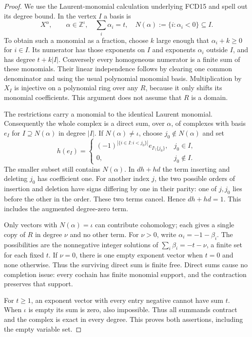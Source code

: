\documentclass[11pt,a4paper]{article}
\numberwithin{equation}{section}
\theoremstyle{remark}\newtheorem{remark}[theorem]{Remark}
\begin{document}
\begin{proof}
We use the Laurent-monomial calculation underlying FCD15 and spell
out its degree bound.  In the vertex $I$ a basis is
\[
 X^\alpha,\qquad
 \alpha\in\mathbb Z^\iota,\quad
 \sum_i\alpha_i=t,\quad
 N(\alpha):=\{i:\alpha_i<0\}\subseteq I .
                                                        \tag{SHV.6}
\]
To obtain such a monomial as a fraction, choose $k$ large enough that
$\alpha_i+k\ge0$ for $i\in I$.  Its numerator has those exponents
on $I$ and exponents $\alpha_i$ outside $I$, and has degree
$t+k|I|$.  Conversely every homogeneous numerator is a finite sum
of these monomials.  Their linear independence follows by clearing
one common denominator and using the usual polynomial monomial
basis.  Multiplication by $X_I$ is injective on a polynomial ring
over any $R$, because it only shifts its monomial coefficients.
This argument does not assume that $R$ is a domain.

The restrictions carry a monomial to the identical Laurent monomial.
Consequently the whole complex is a direct sum, over $\alpha$, of
complexes with basis $e_I$ for $I\supseteq N(\alpha)$ in degree $|I|$.
If $N(\alpha)\ne\iota$, choose $j_0\notin N(\alpha)$ and set
\[
 h(e_I)=
 \begin{cases}
 (-1)^{|\{i\in I:i<j_0\}|}e_{I\setminus\{j_0\}},&j_0\in I,\\
 0,&j_0\notin I.
 \end{cases}                                           \tag{SHV.7}
\]
The smaller subset still contains $N(\alpha)$.  In $dh+hd$ the
term inserting and deleting $j_0$ has coefficient one.  For
another index $j$, the two possible orders of insertion and deletion
have signs differing by one in their parity: one of $j,j_0$ lies
before the other in the order.  These two terms cancel.  Hence
$dh+hd=1$.  This includes the augmented degree-zero term.

Only vectors with $N(\alpha)=\iota$ can contribute cohomology;
each gives a single copy of $R$ in degree $\nu$ and no other term.
For $\nu>0$, write $\alpha_i=-1-\beta_i$.  The possibilities are
the nonnegative integer solutions of
$\sum_i\beta_i=-t-\nu$, a finite set for each fixed $t$.
If $\nu=0$, there is one empty exponent vector when $t=0$ and
none otherwise.  Thus the surviving direct sum is finite free.
Direct sums cause no completion issue: every cochain has finite
monomial support, and the contraction preserves that support.

For $t\ge1$, an exponent vector with every entry negative cannot
have sum $t$.  When $\iota$ is empty its sum is zero, also
impossible.  Thus all summands contract and the complex is exact
in every degree.  This proves both assertions, including the
empty variable set.
\end{proof}
\end{document}
